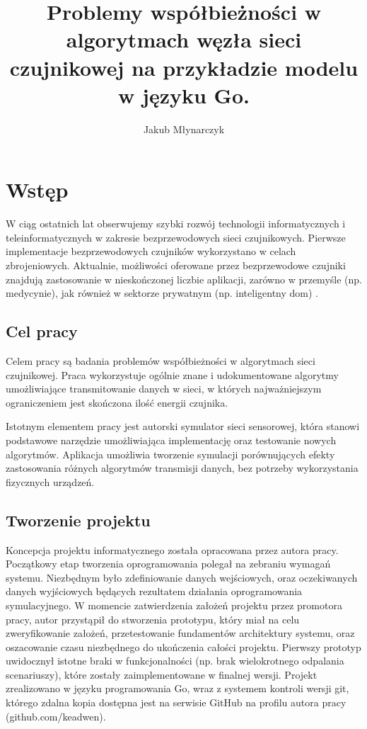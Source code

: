 \documentclass[a4paper,12pt,twoside,openany]{report}
\title{Problemy współbieżności w algorytmach węzła sieci czujnikowej na przykładzie modelu w języku Go.}
\author{Jakub Młynarczyk}
\begin{document}
\maketitle

\chapter{Wstęp}

W ciąg ostatnich lat obserwujemy szybki rozwój technologii informatycznych i teleinformatycznych w zakresie bezprzewodowych sieci czujnikowych.
Pierwsze implementacje bezprzewodowych czujników wykorzystano w celach zbrojeniowych. Aktualnie, możliwości oferowane przez bezprzewodowe 
czujniki znajdują zastosowanie w nieskończonej liczbie aplikacji, zarówno w przemyśle (np. medycynie), jak również w sektorze prywatnym (np. inteligentny dom) \cite{Shen}.

\section{Cel pracy}
Celem pracy są badania problemów współbieżności w algorytmach sieci czujnikowej. Praca wykorzystuje 
ogólnie znane i udokumentowane algorytmy umożliwiające transmitowanie danych w sieci, w których najważniejszym ograniczeniem jest skończona ilość energii czujnika.

Istotnym elementem pracy jest autorski symulator sieci sensorowej, która stanowi podstawowe narzędzie umożliwiająca implementację oraz testowanie nowych algorytmów.
Aplikacja umożliwia tworzenie symulacji porównujących efekty zastosowania różnych algorytmów transmisji danych, bez potrzeby wykorzystania fizycznych urządzeń.

\section{Tworzenie projektu}
Koncepcja projektu informatycznego została opracowana przez autora pracy. Początkowy etap tworzenia oprogramowania polegał na zebraniu wymagań systemu.
Niezbędnym było zdefiniowanie danych wejściowych, oraz oczekiwanych danych wyjściowych będących rezultatem działania oprogramowania symulacyjnego.
W momencie zatwierdzenia założeń projektu przez promotora pracy, autor przystąpił do stworzenia prototypu, który miał na celu zweryfikowanie założeń, przetestowanie fundamentów architektury systemu, 
oraz oszacowanie czasu niezbędnego do ukończenia całości projektu. Pierwszy prototyp uwidocznył istotne braki w funkcjonalności (np. brak wielokrotnego odpalania scenariuszy), które zostały
zaimplementowane w finalnej wersji. Projekt zrealizowano w języku programowania Go, wraz z systemem kontroli wersji git, którego zdalna kopia dostępna jest na serwisie GitHub
na profilu autora pracy (github.com/keadwen).
\end{document}
